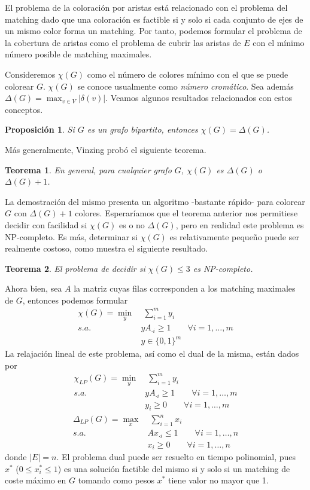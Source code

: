 \documentclass[twoside,a4paper,openright,12pt]{book}
\newtheorem{prop}{Proposici\'on}[section]
\newtheorem{thm}{Teorema}[section]
\begin{document}
El problema de la coloración por aristas está relacionado con el problema del matching dado que una coloración es factible si y solo si cada conjunto de ejes de un mismo color forma un matching. Por tanto, podemos formular el problema de la cobertura de aristas como el problema de cubrir las aristas de $E$ con el mínimo número posible de matching maximales. 

Consideremos $\chi(G)$ como el número de colores mínimo con el que se puede colorear $G$. $\chi(G)$ se conoce usualmente como \textit{número cromático}. Sea además $\Delta(G) = \max_{v\in V} |\delta(v)|$. Veamos algunos resultados relacionados con estos conceptos.
\begin{prop}
Si $G$ es un grafo bipartito, entonces $\chi(G)=\Delta(G)$. 
\end{prop}
Más generalmente, Vinzing probó el siguiente teorema.
\begin{thm}
En general, para cualquier grafo $G$, $\chi(G)$ es $\Delta(G)$ o $\Delta(G)+1$. 
\end{thm}
La demostración del mismo presenta un algoritmo -bastante rápido- para colorear $G$ con $\Delta(G)+1$ colores. Esperaríamos que el teorema anterior nos permitiese decidir con facilidad si $\chi(G)$ es o no $\Delta(G)$, pero en realidad este problema es NP-completo. Es más, determinar si $\chi(G)$ es relativamente pequeño puede ser realmente costoso, como muestra el siguiente resultado.
\begin{thm}
El problema de decidir si $\chi(G)\leq 3$ es NP-completo.
\end{thm}
Ahora bien, sea $A$ la matriz cuyas filas corresponden a los matching maximales de $G$, entonces podemos formular
\begin{align*}
\chi(G)=\min_{y} &\; \sum_{i=1}^m  y_{i}  \nonumber\\ 
s.a.\;  &  yA_{\cdot i} \geq  1 \qquad \forall i=1,\dotsc,m\\
& y\in\{0,1\}^{m}\nonumber
\end{align*}
La relajación lineal de este problema, así como el dual de la misma, están dados por
\begin{align*}
\chi_{LP}(G)=\min_{y} &\; \sum_{i=1}^m  y_{i}  \nonumber\\ 
s.a.\;  &  yA_{\cdot i} \geq  1 \qquad \forall i=1,\dotsc,m\\
& y_i \geq 0  \qquad \forall i=1,\dotsc,m 
\end{align*}
\begin{align*}
\Delta_{LP}(G)=\max_{x} &\; \sum_{i=1}^n  x_i  \nonumber\\ 
s.a.\;  &  Ax_{\cdot i} \leq  1 \qquad \forall i=1,\dotsc,n\\
& x_i\geq 0  \qquad \forall i=1,\dotsc,n
\end{align*}
donde $|E|=n$. El problema dual puede ser resuelto en tiempo polinomial, pues $x^*$ ($0\leq x^*_i \leq 1$) es una solución factible del mismo si y solo si un matching de coste máximo en $G$ tomando como pesos $x^*$ tiene valor no mayor que 1.
\end{document}

